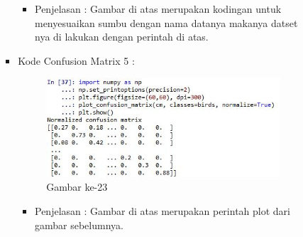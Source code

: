 \begin{enumerate}
\begin{itemize}
\begin{itemize}
\begin{itemize}
\par
\begin{itemize}
\item Penjelasan : Gambar di atas merupakan kodingan untuk menyesuaikan sumbu dengan nama datanya makanya datset nya di lakukan dengan perintah di atas.
\par
\par
\par
\end{itemize}
\item Kode Confusion Matrix 5 :
\par
\begin{figure}[ht]
\centering
\includegraphics[scale=0.7]{figures/hmm/cod23.jpeg}
\caption{Gambar ke-23}
\label{contoh}
\end{figure}
\par
\begin{itemize}
\item Penjelasan : Gambar di atas merupakan perintah plot dari gambar sebelumnya.
\par
\par
\par
\end{itemize}

\end{itemize}


\end{itemize}
\end{itemize}
\end{enumerate}
